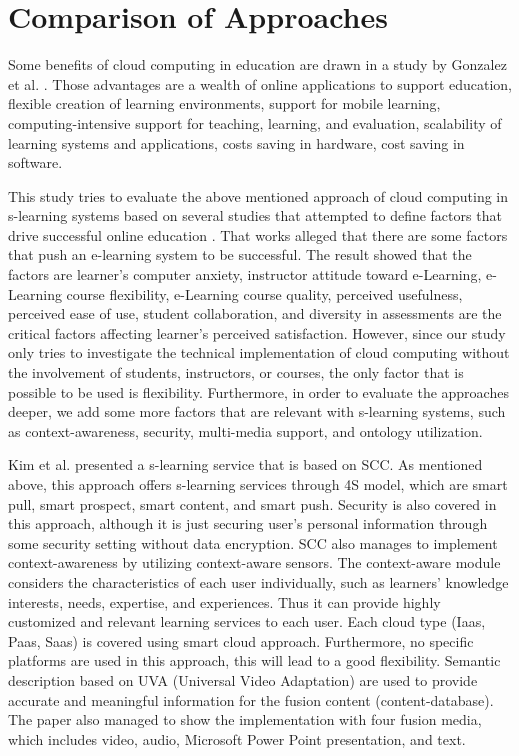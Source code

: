 \documentclass[journal]{vgtc}
\begin{document}
\section{Comparison of Approaches}
Some benefits of cloud computing in education are drawn in a study by Gonzalez et al. \cite{Gonzalez-Martinez2014}. Those advantages are a wealth of online applications to support education, flexible creation of learning environments, support for mobile learning, computing-intensive support for teaching, learning, and evaluation, scalability of learning systems and applications, costs saving in hardware, cost saving in software.

This study tries to evaluate the above mentioned approach of cloud computing in s-learning systems based on several studies that attempted to define factors that drive successful online education \cite{Sun2008,Fetaji2007,Laily2013}. That works alleged that there are some factors that push an e-learning system to be successful. The result showed that the factors are learner's computer anxiety, instructor attitude toward e-Learning, e-Learning course flexibility, e-Learning course quality, perceived usefulness, perceived ease of use, student collaboration, and diversity in assessments are the critical factors affecting learner's perceived satisfaction. However, since our study only tries to investigate the technical implementation of cloud computing without the involvement of students, instructors, or courses, the only factor that is possible to be used is flexibility. Furthermore, in order to evaluate the approaches deeper, we add some more factors that are relevant with s-learning systems, such as context-awareness, security, multi-media support, and ontology utilization.

Kim et al. presented a s-learning service that is based on SCC. As mentioned above, this approach offers s-learning services through 4S model, which are smart pull, smart prospect, smart content, and smart push. Security is also covered in this approach, although it is just securing user's personal information through some security setting without data encryption. SCC also manages to implement context-awareness by utilizing context-aware sensors. The context-aware module considers the characteristics of each user individually, such as learners' knowledge interests, needs, expertise, and experiences. Thus it can provide highly customized and relevant learning services to each user. Each cloud type (Iaas, Paas, Saas) is covered using smart cloud approach. Furthermore, no specific platforms are used in this approach, this will lead to a good flexibility. Semantic description based on UVA (Universal Video Adaptation) are used to provide accurate and meaningful information for the fusion content (content-database). The paper also managed to show the implementation with four fusion media, which includes video, audio, Microsoft Power Point presentation, and text.
\end{document}
